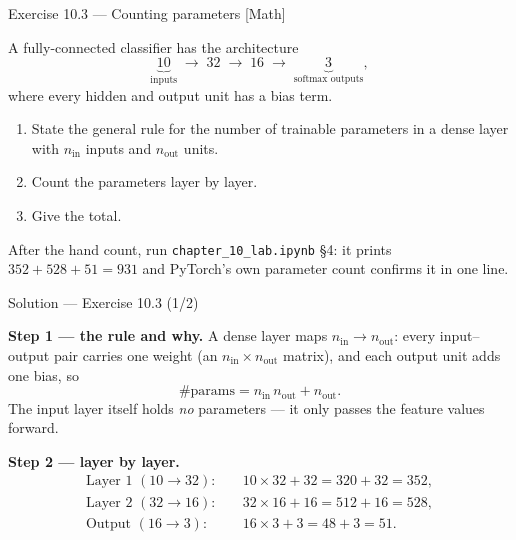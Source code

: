 \documentclass[aspectratio=169,11pt]{beamer}
\begin{document}
\begin{frame}{Exercise 10.3 --- Counting parameters [Math]}
\begin{exercise}
  A fully-connected classifier has the architecture
  \[
    \underbrace{10}_{\text{inputs}}
    \;\rightarrow\; 32 \;\rightarrow\; 16
    \;\rightarrow\; \underbrace{3}_{\text{softmax outputs}},
  \]
  where every hidden and output unit has a bias term.
  \begin{enumerate}
    \item State the general rule for the number of trainable
          parameters in a dense layer with $n_{\text{in}}$ inputs and
          $n_{\text{out}}$ units.
    \item Count the parameters layer by layer.
    \item Give the total.
  \end{enumerate}
\end{exercise}
\begin{labnote}
  After the hand count, run \texttt{chapter\_10\_lab.ipynb} \S4: it prints
  $352+528+51=931$ and PyTorch's own parameter count confirms it in one line.
\end{labnote}
\end{frame}

\begin{frame}{Solution --- Exercise 10.3 (1/2)}
\begin{solutionbox}
  \textbf{Step 1 --- the rule and why.} A dense layer maps
  $n_{\text{in}} \to n_{\text{out}}$: every input--output pair carries one
  weight (an $n_{\text{in}} \times n_{\text{out}}$ matrix), and each output
  unit adds one bias, so
  \[
    \#\text{params} = n_{\text{in}}\, n_{\text{out}} + n_{\text{out}} .
  \]
  The input layer itself holds \emph{no} parameters --- it only passes the
  feature values forward.

  \medskip
  \textbf{Step 2 --- layer by layer.}
  \[
    \begin{aligned}
      \text{Layer 1 } (10 \to 32): &\quad 10 \times 32 + 32 = 320 + 32 = 352, \\
      \text{Layer 2 } (32 \to 16): &\quad 32 \times 16 + 16 = 512 + 16 = 528, \\
      \text{Output } (16 \to 3):   &\quad 16 \times 3  + 3  = 48  + 3  = 51 .
    \end{aligned}
  \]
\end{solutionbox}
\end{frame}
\end{document}

